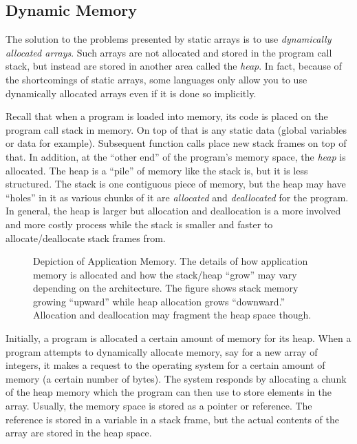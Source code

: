 \subsection{Dynamic Memory}

The solution to the problems presented by static arrays is to use 
\emph{dynamically allocated arrays}.  Such arrays
are not allocated and stored in the program call stack, but instead are
stored in another area called the \emph{heap}.  In fact, because of the 
shortcomings of static arrays, some languages only allow you to use 
dynamically allocated arrays even if it is done so implicitly.

Recall that when a program is loaded into memory, its code is placed
on the program call stack in memory.  On top of that is any static data 
(global variables or data for example). Subsequent 
function calls place new stack frames on top of that.  In addition, 
at the ``other end'' of the program's memory space, the \emph{heap}
is allocated.  The heap is a ``pile'' of memory like the stack is, but it
is less structured.  The stack is one contiguous piece of memory, but
the heap may have ``holes'' in it as various chunks of it are \emph{allocated}
and \emph{deallocated} for the program.  In general, the heap is larger 
but allocation and deallocation is a more involved and more costly 
process while the stack is smaller and faster to allocate/deallocate 
stack frames from.

\begin{figure}
\centering

\caption[Depiction of Application Memory.]{Depiction of Application Memory.  The details of
how application memory is allocated and how the stack/heap ``grow'' may vary depending
on the architecture.  The figure shows stack memory growing ``upward'' while heap allocation
grows ``downward.''  Allocation and deallocation may fragment the heap space though.}
\label{figure:stackAndHeap}
\end{figure}

Initially, a program is allocated a certain amount of memory for its heap.
When a program attempts to dynamically allocate memory, say for a
new array of integers, it makes a request to the operating system for
a certain amount of memory (a certain number of bytes).  The system
responds by allocating a chunk of the heap memory which the program
can then use to store elements in the array.  Usually, the memory space
is stored as a pointer or reference.  The reference is stored in a variable
in a stack frame, but the actual contents of the array are stored in the
heap space.

